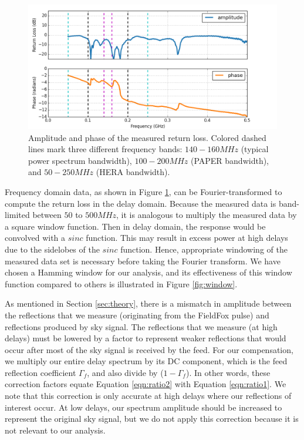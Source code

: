 \documentclass[12pt,preprint]{aastex}
\begin{document}
\begin{figure}[ht!]
\centering
\includegraphics[totalheight=0.4\textheight]{plots/frequency_amp_phase_fullbw.png}
\caption{Amplitude and phase of the measured return loss. Colored dashed lines
mark three different frequency bands: $140-160MHz$ (typical power spectrum bandwidth), $100-200MHz$ (PAPER bandwidth), and
$50-250MHz$ (HERA bandwidth).}
\label{fig:freq}
\end{figure}

Frequency domain data, as shown in Figure \ref{fig:freq}, can be Fourier-transformed to compute the return loss in the delay domain. Because the measured data is band-limited between $50$ to $500MHz$, it is analogous to multiply the measured data by a square window function. Then in delay domain, the response would be convolved with a $sinc$ function. This may result in excess power at high
delays due to the sidelobes of the $sinc$ function. Hence, appropriate windowing of the measured data set is necessary before taking the Fourier transform.
We have chosen a Hamming window for our analysis, and its effectiveness of this
window function compared to others is illustrated in Figure
\ref{fig:window}. 

As mentioned in Section \ref{sec:theory}, there is a mismatch in amplitude
between the reflections that we measure (originating from the FieldFox pulse)
and reflections produced by sky signal. The reflections that we measure (at high
delays) must be lowered by a factor to represent weaker reflections that would
occur after most of the sky signal is received by the feed. For our
compensation, we multiply our entire delay spectrum by its DC component, which is the feed reflection coefficient $\Gamma_{f}$, and also divide by ($1-\Gamma_{f}$). In other words, these correction factors equate Equation \ref{eqn:ratio2} with Equation \ref{eqn:ratio1}. 
We note that this correction is only accurate at high delays where our
reflections of interest occur. At low delays, our spectrum amplitude should be
increased to represent the original sky signal, but we do not apply this
correction because it is not relevant to our analysis.
\end{document}
